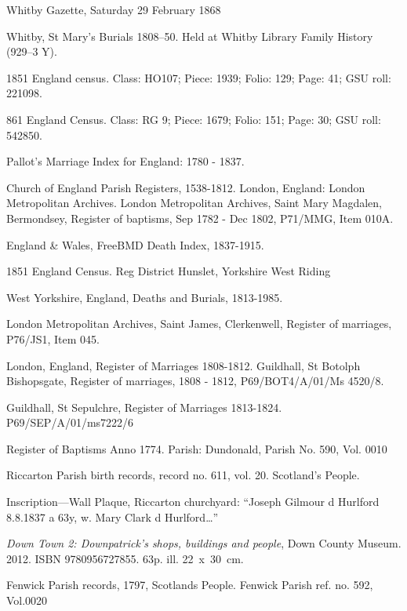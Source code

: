 \begin{thebibliography}{99}
	Whitby Gazette, Saturday 29 February 1868
	
	Whitby, St Mary's Burials 1808--50. Held at Whitby Library Family History (929--3 Y).

	 1851 England census. Class: HO107; Piece: 1939; Folio: 129; Page: 41; GSU roll: 221098.
	 
	861 England Census. Class: RG 9; Piece: 1679; Folio: 151; Page: 30; GSU roll: 542850.
	
	 Pallot's Marriage Index for England: 1780 - 1837.
	 
	Church of England Parish Registers, 1538-1812. London, England: London Metropolitan Archives.
	London Metropolitan Archives, Saint Mary Magdalen, Bermondsey, Register of baptisms, Sep 1782 - Dec 1802, 		P71/MMG, Item 010A.
	
	England \& Wales, FreeBMD Death Index, 1837-1915. 
	
	1851 England Census. Reg District Hunslet, Yorkshire West Riding
	
	West Yorkshire, England, Deaths and Burials, 1813-1985. 
	
	London Metropolitan Archives, Saint James, Clerkenwell, Register of marriages, P76/JS1, Item 045. 
	
	 London, England, Register of Marriages 1808-1812.
	 Guildhall, St Botolph Bishopsgate, Register of marriages, 1808 - 1812, P69/BOT4/A/01/Ms 4520/8.
	 
	 Guildhall, St Sepulchre, Register of Marriages 1813-1824. P69/SEP/A/01/ms7222/6
	 
	 Register of Baptisms Anno 1774. Parish: Dundonald, Parish No. 590, Vol. 0010

	Riccarton Parish birth records, record no. 611, vol. 20. Scotland's People.

	Inscription---Wall Plaque, Riccarton churchyard:
	``Joseph Gilmour d Hurlford 8.8.1837 a 63y, w. Mary Clark d Hurlford\dots''

	\emph{Down Town 2: Downpatrick's shops, buildings and people}, Down County Museum.
	2012. ISBN 9780956727855. 63p. ill. 22~x~30~cm.

	Fenwick Parish records, 1797, Scotlands People. Fenwick Parish ref. no. 592, Vol.0020


\end{thebibliography}
